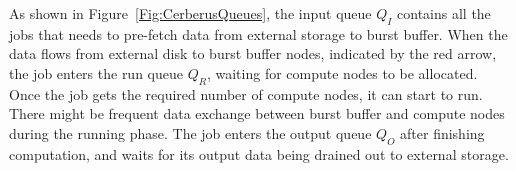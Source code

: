 

As shown in Figure~\ref{Fig:CerberusQueues},
the input queue $Q_I$ contains all the jobs that
needs to pre-fetch data from external storage to burst buffer.
When the data flows from external disk
to burst buffer nodes, indicated by the red arrow, the job enters the run queue $Q_R$, 
waiting for compute nodes to be allocated.
Once the job gets the required number of compute nodes, it can start to run.
There might be frequent data exchange between burst buffer and compute nodes during the running phase. 
The job enters the output queue $Q_O$ after finishing computation, 
and waits for its output data being drained out to external storage. 

